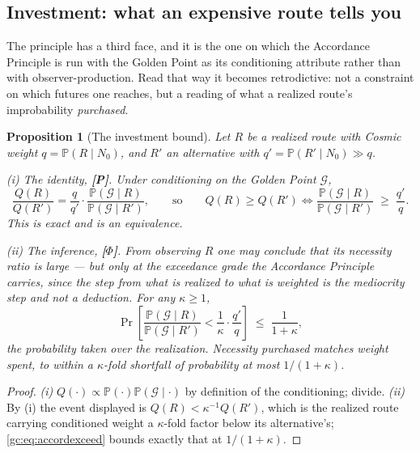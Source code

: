 \documentclass[11pt]{article}
\numberwithin{equation}{section}
\theoremstyle{plain}
\newtheorem{proposition}[theorem]{Proposition}
\theoremstyle{definition}
\theoremstyle{remark}
\newcommand{\PP}{\mathbb{P}}
\begin{document}
\subsection{Investment: what an expensive route tells you}
\label{ra:sub:investment}

The principle has a third face, and it is the one on which the Accordance
Principle is run with the Golden Point as its conditioning attribute
rather than with observer-production. Read that way it becomes
retrodictive: not a constraint on which futures one reaches, but a
reading of what a realized route's improbability \emph{purchased}.

\begin{proposition}[The investment bound]\label{ra:prop:investment}
Let $R$ be a realized route with Cosmic weight $q=\PP(R\mid N_0)$, and
$R'$ an alternative with $q'=\PP(R'\mid N_0)\gg q$.

\emph{(i) The identity, \textbf{[P]}.} Under conditioning on the Golden
Point $\mathcal G$,
\begin{equation}\label{ra:eq:invest}
\frac{Q(R)}{Q(R')}
=\frac{q}{q'}\cdot\frac{\PP(\mathcal G\mid R)}{\PP(\mathcal G\mid R')},
\qquad\text{so}\qquad
Q(R)\ge Q(R')
\iff
\frac{\PP(\mathcal G\mid R)}{\PP(\mathcal G\mid R')}\;\ge\;\frac{q'}{q}.
\end{equation}
This is exact and is an equivalence.

\emph{(ii) The inference, \textbf{[$\Phi$]}.} From \emph{observing} $R$
one may conclude that its necessity ratio is large --- but only at the
exceedance grade the Accordance Principle carries, since the step from
what is realized to what is weighted is the mediocrity step and not a
deduction. For any $\kappa\ge1$,
\begin{equation}\label{ra:eq:investexceed}
\Pr\left[\frac{\PP(\mathcal G\mid R)}{\PP(\mathcal G\mid R')}
<\frac1\kappa\cdot\frac{q'}{q}\right]\;\le\;\frac{1}{1+\kappa},
\end{equation}
the probability taken over the realization. \emph{Necessity purchased
matches weight spent, to within a $\kappa$-fold shortfall of probability
at most $1/(1+\kappa)$.}
\end{proposition}

\begin{proof}
\emph{(i)} $Q(\cdot)\propto\PP(\cdot)\PP(\mathcal G\mid\cdot)$ by
definition of the conditioning; divide. \emph{(ii)} By (i) the event
displayed is $Q(R)<\kappa^{-1}Q(R')$, which is the realized route
carrying conditioned weight a $\kappa$-fold factor below its
alternative's; \eqref{gc:eq:accordexceed} bounds exactly that at
$1/(1+\kappa)$.
\end{proof}
\end{document}
